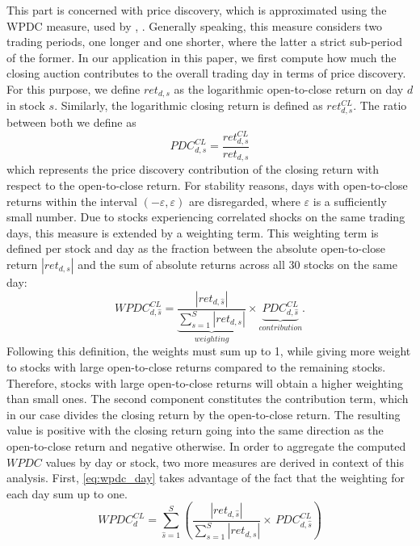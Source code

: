 \documentclass[11pt,a4paper]{article}
\begin{document}
    This part is concerned with price discovery, which is approximated using the \ac{WPDC} measure, used by \textcite{BarclayWarner1993}, \textcite{BarclayHendershott2003}. Generally speaking, this measure considers two trading periods, one longer and one shorter, where the latter a strict sub-period of the former. In our application in this paper, we first compute how much the closing auction contributes to the overall trading day in terms of price discovery. For this purpose, we define $ret_{d,s}$ as the logarithmic open-to-close return on day $d$ in stock $s$. Similarly, the logarithmic closing return is defined as $ret^{CL}_{d,s}$. The ratio between both we define as
    \begin{equation*}
        PDC^{CL}_{d,s} = \frac{ret^{CL}_{d,s}}{ret_{d,s}}
    \end{equation*}
    which represents the price discovery contribution of the closing return with respect to the open-to-close return. For stability reasons, days with open-to-close returns within the interval $(-\varepsilon, \varepsilon)$ are disregarded, where $\varepsilon$ is a sufficiently small number. Due to stocks experiencing correlated shocks on the same trading days, this measure is extended by a weighting term. This weighting term is defined per stock and day as the fraction between the absolute open-to-close return $|ret_{d,s}|$ and the sum of absolute returns across all 30 stocks on the same day:
    \begin{equation}
        \label{eq:wpdc_base}
        WPDC^{CL}_{d,\hat{s}} = \underbrace{\frac{|ret_{d,\hat{s}}|}{\sum_{s=1}^{S} |ret_{d,s}|}}_{weighting}  \times \underbrace{PDC^{CL}_{d,\hat{s}}}_{contribution}.
    \end{equation}
    Following this definition, the weights must sum up to 1, while giving more weight to stocks with large open-to-close returns compared to the remaining stocks. Therefore, stocks with large open-to-close returns will obtain a higher weighting than small ones. The second component constitutes the contribution term, which in our case divides the closing return by the open-to-close return. The resulting value is positive with the closing return going into the same direction as the open-to-close return and negative otherwise. In order to aggregate the computed $WPDC$ values by day or stock, two more measures are derived in context of this analysis. First, \cref{eq:wpdc_day} takes advantage of the fact that the weighting for each day sum up to one.
    \begin{equation}
        \label{eq:wpdc_day}
        WPDC^{CL}_{d} = \sum_{\hat{s}=1}^{S} \left( \frac{|ret_{d,\hat{s}}|}{\sum_{s=1}^{S} |ret_{d,s}|} \times \, PDC^{CL}_{d,\hat{s}} \right)
    \end{equation}
\end{document}
